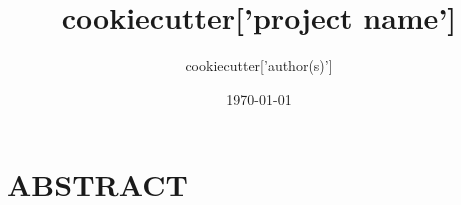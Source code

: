 \documentclass{article}
\title{ {{ cookiecutter['project name'] }} }
\author{ {{ cookiecutter['author(s)'] }} }
\date{\today}
\begin{document}
\maketitle

\section*{ABSTRACT}


\end{document}
